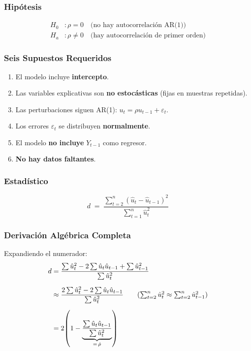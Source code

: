 \documentclass[11pt, letterpaper]{article}
\begin{document}
\subsubsection{Hip\'otesis}
\begin{align*}
  H_0 &: \rho = 0 \quad\text{(no hay autocorrelaci\'on AR(1))}\\
  H_a &: \rho \neq 0 \quad\text{(hay autocorrelaci\'on de primer orden)}
\end{align*}

\subsubsection{Seis Supuestos Requeridos}
\begin{enumerate}
  \item El modelo incluye \textbf{intercepto}.
  \item Las variables explicativas son \textbf{no estoc\'asticas}
    (fijas en muestras repetidas).
  \item Las perturbaciones siguen AR(1):
    $u_t = \rho u_{t-1} + \varepsilon_t$.
  \item Los errores $\varepsilon_t$ se distribuyen \textbf{normalmente}.
  \item El modelo \textbf{no incluye} $Y_{t-1}$ como regresor.
  \item \textbf{No hay datos faltantes}.
\end{enumerate}

\subsubsection{Estad\'istico}

\[
  \boxed{
    d \;=\; \frac{\displaystyle\sum_{t=2}^{n}(\hat{u}_t - \hat{u}_{t-1})^2}
                 {\displaystyle\sum_{t=1}^{n}\hat{u}_t^2}
  }
\]

\subsubsection{Derivaci\'on Alg\'ebrica Completa}

Expandiendo el numerador:
\begin{align}
  d &= \frac{\sum \hat{u}_t^2
             - 2\sum \hat{u}_t\hat{u}_{t-1}
             + \sum \hat{u}_{t-1}^2}
            {\sum \hat{u}_t^2}
  \notag\\[6pt]
    &\approx
    \frac{2\sum \hat{u}_t^2 - 2\sum \hat{u}_t\hat{u}_{t-1}}
         {\sum \hat{u}_t^2}
  \tag{$\sum_{t=2}^n\hat u_t^2 \approx \sum_{t=2}^n\hat u_{t-1}^2$}
  \\[6pt]
    &= 2\!\left(1 - \underbrace{\frac{\sum\hat{u}_t\hat{u}_{t-1}}{\sum\hat{u}_t^2}}_{=\,\hat\rho}\right)
  \notag
\end{align}
\end{document}
